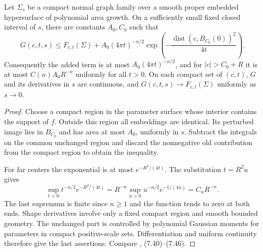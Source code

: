 \begin{lemma}\label{lem:entropy-compact-perturbation-bounds}
Let $\Sigma_s$ be a compact normal graph family over a smooth proper embedded hypersurface of polynomial area growth. On a sufficiently small fixed closed interval of $s$, there are constants $A_0,C_0$ such that
\[
 G(c,t,s)\leq F_{c,t}(\Sigma)+A_0(4\pi t)^{-n/2}
 \exp\left(-\frac{\operatorname{dist}(c,B_{C_0}(0))^2}{4t}\right).
\]
Consequently the added term is at most $A_0(4\pi t)^{-n/2}$, and for $|c|>C_0+R$ it is at most $C(n)A_0R^{-n}$ uniformly for all $t>0$. On each compact set of $(c,t)$, $G$ and its derivatives in $s$ are continuous, and $G(c,t,s)\to F_{c,t}(\Sigma)$ uniformly as $s\to0$.
\end{lemma}
\begin{proof}
Choose a compact region in the parameter surface whose interior contains the support of $f$. Outside this region all embeddings are identical. Its perturbed image lies in $B_{C_0}$ and has area at most $A_0$, uniformly in $s$. Subtract the integrals on the common unchanged region and discard the nonnegative old contribution from the compact region to obtain the inequality.

For far centers the exponential is at most $e^{-R^2/(4t)}$. The substitution $t=R^2u$ gives
\[
 \sup_{t>0}t^{-n/2}e^{-R^2/(4t)}
 =R^{-n}\sup_{u>0}u^{-n/2}e^{-1/(4u)}=C_nR^{-n}.
\]
The last supremum is finite since $n\geq1$ and the function tends to zero at both ends. Shape derivatives involve only a fixed compact region and smooth bounded geometry. The unchanged part is controlled by polynomial Gaussian moments for parameters in compact positive-scale sets. Differentiation and uniform continuity therefore give the last assertions. Compare \cite{CM12}, (7.40)--(7.46).
\end{proof}

